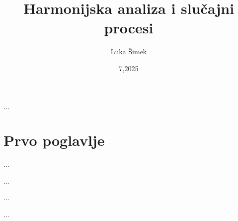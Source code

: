 \documentclass[a4paper,twoside,12pt]{memoir}
\date{\displaydate{date}}
\title{Harmonijska analiza i slučajni procesi}
\author{Luka Šimek}
\date{7,2025}
\begin{document}
\frontmatter

\begin{intro}
	...
\end{intro}

\chapter{Prvo poglavlje}
...



\pagestyle{empty}

\begin{sazetak}
	...
\end{sazetak}

\begin{summary}
	...
\end{summary}

\begin{cv}
	...
\end{cv}
\end{document}
